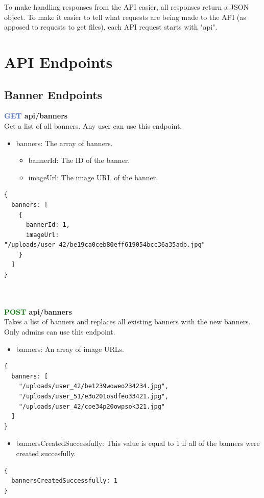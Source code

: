 \documentclass[onecolumn, draftclsnofoot,10pt, compsoc, usenames, dvipsnames]{IEEEtran}
\begin{document}
To make handling responses from the API easier, all responses return a JSON object. To make it easier to tell what requests are being made to the API (as apposed to requests to get files), each API request starts with "api".

\section{API Endpoints}

\subsection{Banner Endpoints}

\noindent
\textbf{\textcolor{RoyalBlue}{GET} api/banners} \\
Get a list of all banners. Any user can use this endpoint.
\begin{itemize}
    \item banners: The array of banners.
    \begin{itemize}
        \item bannerId: The ID of the banner.
        \item imageUrl: The image URL of the banner.
    \end{itemize}
\end{itemize}
\begin{lstlisting}[caption=Example Response]
{ 
  banners: [
    {
      bannerId: 1,
      imageUrl: "/uploads/user_42/be19ca0ceb80eff619054bcc36a35adb.jpg"
    }
  ]
}
\end{lstlisting}
\\~\\

\noindent
\textbf{\textcolor{Green}{POST} api/banners} \\
Takes a list of banners and replaces all existing banners with the new banners. Only admins can use this endpoint.
\begin{itemize}
    \item banners: An array of image URLs.
\end{itemize}
\begin{lstlisting}[caption=Example Request Body]
{ 
  banners: [
    "/uploads/user_42/be1239woweo234234.jpg",
    "/uploads/user_51/e3o201osdfeo33421.jpg",
    "/uploads/user_42/coe34p20owpsok321.jpg"
  ]
}
\end{lstlisting}
\begin{itemize}
  \item bannersCreatedSuccessfully: This value is equal to 1 if all of the banners were created succesfully.
\end{itemize}
\begin{lstlisting}[caption=Example Response]
{ 
  bannersCreatedSuccessfully: 1
}
\end{lstlisting}
\\~\\
\end{document}
